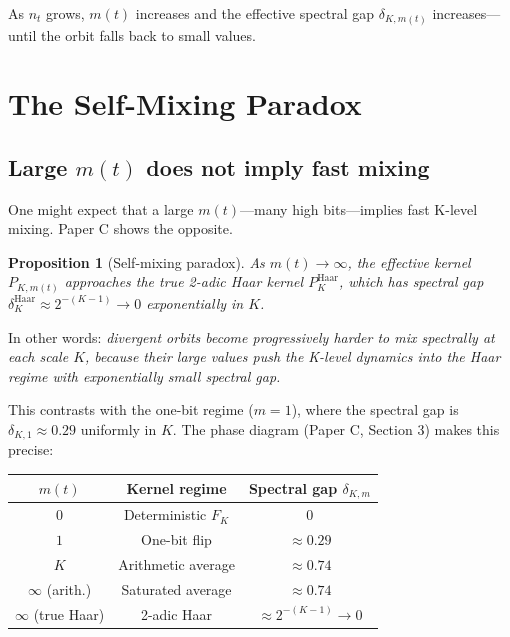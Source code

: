 \documentclass[12pt]{article}
\newtheorem{proposition}[theorem]{Proposition}
\theoremstyle{definition}
\begin{document}
As $n_t$ grows, $m(t)$ increases and the effective spectral gap $\delta_{K,m(t)}$ increases---until the orbit falls back to small values.

\section{The Self-Mixing Paradox}
\label{sec:paradox}

\subsection{Large $m(t)$ does not imply fast mixing}

One might expect that a large $m(t)$---many high bits---implies fast K-level mixing. Paper C shows the opposite.

\begin{proposition}[Self-mixing paradox]
\label{prop:paradox}
As $m(t) \to \infty$, the effective kernel $P_{K,m(t)}$ approaches the true 2-adic Haar kernel $P_K^{\mathrm{Haar}}$, which has spectral gap $\delta_K^{\mathrm{Haar}} \approx 2^{-(K-1)} \to 0$ exponentially in $K$.
\end{proposition}

In other words: \emph{divergent orbits become progressively harder to mix spectrally at each scale $K$, because their large values push the K-level dynamics into the Haar regime with exponentially small spectral gap.}

This contrasts with the one-bit regime ($m=1$), where the spectral gap is $\delta_{K,1} \approx 0.29$ uniformly in $K$. The phase diagram (Paper C, Section 3) makes this precise:

\begin{center}
\begin{tabular}{@{}ccc@{}}
\toprule
$m(t)$ & Kernel regime & Spectral gap $\delta_{K,m}$ \\
\midrule
$0$ & Deterministic $F_K$ & $0$ \\
$1$ & One-bit flip & $\approx 0.29$ \\
$K$ & Arithmetic average & $\approx 0.74$ \\
$\infty$ (arith.) & Saturated average & $\approx 0.74$ \\
$\infty$ (true Haar) & 2-adic Haar & $\approx 2^{-(K-1)} \to 0$ \\
\bottomrule
\end{tabular}
\end{center}
\end{document}
